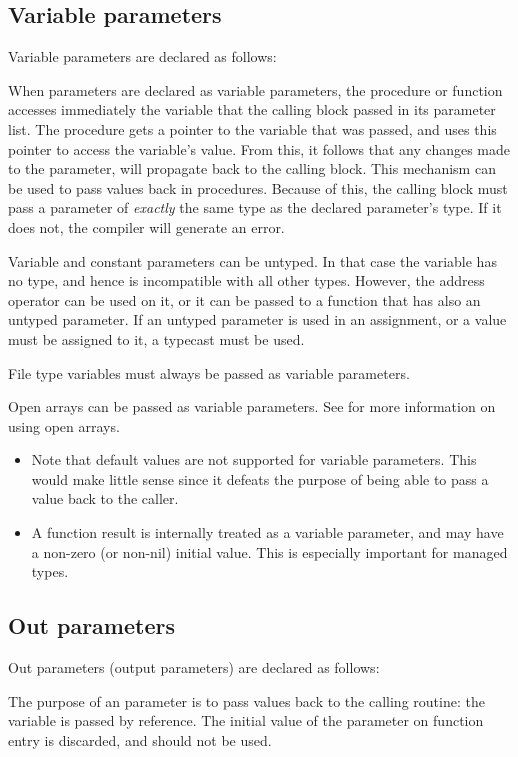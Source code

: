 \subsection{Variable parameters}
\label{se:varparams}
Variable parameters are declared as follows:

When parameters are declared as variable parameters, the procedure or
function accesses immediately the variable that the calling block passed in
its parameter list. The procedure gets a pointer to the variable that was
passed, and uses this pointer to access the variable's value.
From this, it follows that any changes made to the parameter, will
propagate back to the calling block. This mechanism can be used to pass
values back in procedures.
Because of this, the calling block must pass a parameter of {\em exactly}
the same type as the declared parameter's type. If it does not, the compiler
will generate an error.

Variable and constant parameters can be untyped. In that case the variable has no type,
and hence is incompatible with all other types. However, the address operator
can be used on it, or it can be passed to a function that has also an
untyped parameter. If an untyped parameter is used in an assignment,
or a value must be assigned to it, a typecast must be used.

File type variables must always be passed as variable parameters.

Open arrays can be passed as variable parameters. See  for
more information on using open arrays.

\begin{remark}
\begin{itemize}
\item Note that default values are not supported for variable parameters. This
would make little sense since it defeats the purpose of being able to pass a
value back to the caller.
\item A function result is internally treated as a variable parameter, and
may have a non-zero (or non-nil) initial value. This is especially important
for managed types.
\end{itemize}
\end{remark}



\subsection{Out parameters}
\label{se:outparams}
Out parameters  (output parameters) are declared as follows:

The purpose of an  parameter is to pass values back to the calling
routine: the variable is passed by reference. The initial value of the
parameter on function entry is discarded, and should not be used.

